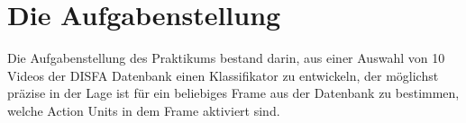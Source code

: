 \section{Die Aufgabenstellung}
Die Aufgabenstellung des Praktikums bestand darin, aus einer Auswahl von 10 Videos der DISFA Datenbank einen Klassifikator zu entwickeln,
der möglichst präzise in der Lage ist für ein beliebiges Frame aus der Datenbank zu bestimmen, welche Action Units in dem Frame aktiviert
sind.

